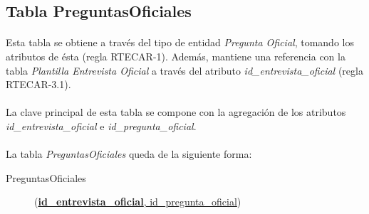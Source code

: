    \subsection{Tabla PreguntasOficiales}

      \paragraph{}Esta tabla se obtiene a través del tipo de entidad
      \textit{Pregunta Oficial}, tomando los atributos de ésta
      (regla RTECAR-1). Además, mantiene una referencia con la tabla
      \textit{Plantilla Entrevista Oficial} a través del atributo
      \textit{id\_entrevista\_oficial} (regla RTECAR-3.1).

      \paragraph{}La clave principal de esta tabla se compone con la agregación
      de los atributos \textit{id\_entrevista\_oficial} e
      \textit{id\_pregunta\_oficial}.

      \paragraph{}La tabla \textit{PreguntasOficiales} queda de la
      siguiente forma:

      \begin{description}
         \item[PreguntasOficiales] \begin{flushleft}(\underline{\textbf{id\_entrevista\_oficial},
         id\_pregunta\_oficial})\end{flushleft}
      \end{description}
